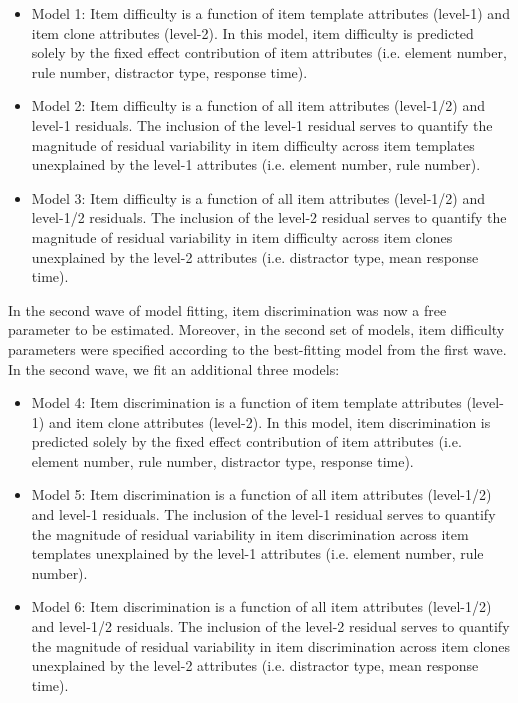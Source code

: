 \documentclass[a4paper,man,natbib]{apa6}
\begin{document}
\begin{itemize}

\item Model 1: Item difficulty is a function of item template attributes (level-1) and item clone attributes (level-2). In this model, item difficulty is predicted solely by the fixed effect contribution of item attributes (i.e. element number, rule number, distractor type, response time). 

\item Model 2: Item difficulty is a function of all item attributes (level-1/2) and level-1 residuals. The inclusion of the level-1 residual serves to quantify the magnitude of residual variability in item difficulty across item templates unexplained by the level-1 attributes (i.e. element number, rule number).

\item Model 3: Item difficulty is a function of all item attributes (level-1/2) and level-1/2 residuals. The inclusion of the level-2 residual serves to quantify the magnitude of residual variability in item difficulty across item clones unexplained by the level-2 attributes (i.e. distractor type, mean response time).

\end{itemize}

In the second wave of model fitting, item discrimination was now a free parameter to be estimated. Moreover, in the second set of models, item difficulty parameters were specified according to the best-fitting model from the first wave. In the second wave, we fit an additional three models:

\begin{itemize}

    \item Model 4: Item discrimination is a function of item template attributes (level-1) and item clone attributes (level-2). In this model, item discrimination is predicted solely by the fixed effect contribution of item attributes (i.e. element number, rule number, distractor type, response time). 
    
    \item Model 5: Item discrimination is a function of all item attributes (level-1/2) and level-1 residuals. The inclusion of the level-1 residual serves to quantify the magnitude of residual variability in item discrimination across item templates unexplained by the level-1 attributes (i.e. element number, rule number).
    
    \item Model 6: Item discrimination is a function of all item attributes (level-1/2) and level-1/2 residuals. The inclusion of the level-2 residual serves to quantify the magnitude of residual variability in item discrimination across item clones unexplained by the level-2 attributes (i.e. distractor type, mean response time).
    
\end{itemize}
\end{document}

